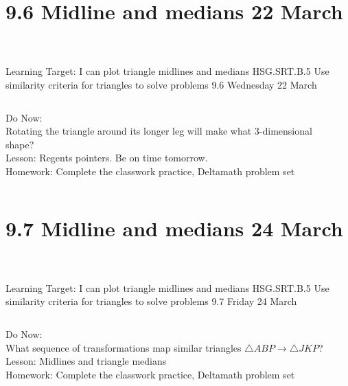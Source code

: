 \documentclass[onlytextwidth, aspectratio=169]{beamer}
\begin{document}
\section{9.6 Midline and medians \hfill 22 March \,}
\begin{frame}{Learning Target: I can plot triangle midlines and medians}
  {HSG.SRT.B.5 Use similarity criteria for triangles to solve problems \hfill \alert{9.6 Wednesday 22 March}}
  \begin{columns}
    Do Now:\\
    Rotating the triangle around its longer leg will make what 3-dimensional shape? \\[0.5cm]
    Lesson: Regents pointers. Be on time tomorrow. \\[0.5cm]
    Homework: Complete the classwork practice, Deltamath problem set \\[0.5cm]
    \begin{flushright}
    \end{flushright}
  \end{columns}
\end{frame}

\section{9.7 Midline and medians \hfill 24 March \,}
\begin{frame}{Learning Target: I can plot triangle midlines and medians}
  {HSG.SRT.B.5 Use similarity criteria for triangles to solve problems \hfill \alert{9.7 Friday 24 March}}
  \begin{columns}
    Do Now:\\
    What sequence of transformations map similar triangles $\triangle ABP \rightarrow \triangle JKP$? \\[0.5cm]
    Lesson: Midlines and triangle medians \\[0.5cm]
    Homework: Complete the classwork practice, Deltamath problem set \\[0.5cm]
    \begin{flushright}
    \end{flushright}
  \end{columns}
\end{frame}
\end{document}
